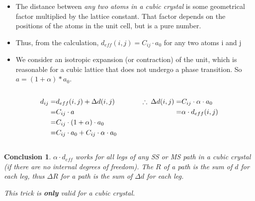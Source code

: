 \documentclass[10pt, xcolor=x11names, compress, handout]{beamer}
\newtheorem{conclusion}[theorem]{Conclusion}
\begin{document}
\begin{frame}
  \begin{itemize}
    \footnotesize%
  \item The distance between \textit{any two atoms in a cubic crystal} is some
    geometrical factor multiplied by the lattice constant.  That
    factor depends on the positions of the atoms in the unit cell, but
    is a pure number.
  \item Thus, from the {\feff} calculation, $d_{eff}(i,j) =
    C_{ij}\cdot a_0$ for any two atoms i and j
  \item We consider an isotropic expansion (or contraction) of the
    unit, which is reasonable for a cubic lattice that does not
    undergo a phase transition.  So $a=(1+\alpha)*a_0$.
  \end{itemize}
  \begin{columns}[T]
    \begin{column}{0.15\linewidth}
      ~
    \end{column}
    \begin{column}{0.35\linewidth}
      \begin{align}
        d_{ij} =& d_{eff}(i,j) + \Delta d(i,j)\notag\\
        =& C_{ij} \cdot a \notag\\
        =& C_{ij} \cdot (1+\alpha)\cdot a_0 \notag\\
        =& C_{ij}\cdot a_0 + C_{ij}\cdot \alpha\cdot a_0\notag
      \end{align}
    \end{column}
    \begin{column}{0.35\linewidth}
      \begin{align}
        \therefore \> \Delta d(i,j) =& C_{ij}\cdot \alpha\cdot a_0\notag\\
        =& \alpha\cdot d_{eff}(i,j)\notag
      \end{align}
    \end{column}
    \begin{column}{0.15\linewidth}
      ~
    \end{column}
  \end{columns}
  \begin{conclusion}
    $\alpha\cdot d_{eff}$ works for all legs of any SS or MS path in a
    cubic crystal (if there are no internal degrees of freedom). The
    $R$ of a path is the sum of $d$ for each leg, thus $\Delta R$ for
    a path is the sum of $\Delta d$ for each leg.\\[-5.5ex]
    \begin{flushright}
      \alert{This trick is \textbf{only} valid for a cubic crystal.}
    \end{flushright}
  \end{conclusion}
\end{frame}
\end{document}

